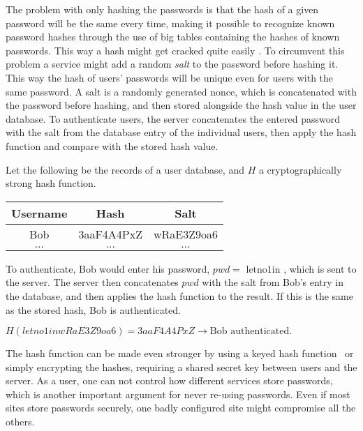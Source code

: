 \par The problem with only hashing the passwords is that the hash of a given password will be the same every time, making it possible to recognize known password hashes through the use of big tables containing the hashes of known passwords. This way a hash might get cracked quite easily . To circumvent this problem a service might add a random \emph{salt} to the password before hashing it. This way the hash of users' passwords will be unique even for users with the same password. A salt is a randomly generated nonce, which is concatenated with the password before hashing, and then stored alongside the hash value in the user database. To authenticate users, the server concatenates the entered password with the salt from the database entry of the individual users, then apply the hash function and compare with the stored hash value.

\begin{example}
Let the following be the records of a user database, and $H$ a cryptographically strong hash function.
    \begin{table}[ht!]
        \centering
    \begin{tabular}{|c|c|c|}
        \hline
        Username & Hash & Salt \\
        \hline
        Bob & 3aaF4A4PxZ & wRaE3Z9oa6 \\
        \hline
        $\dots$ & $\dots$ & $\dots$ \\
        \hline
    \end{tabular}
    \end{table}
\par To authenticate, Bob would enter his password, $pwd=\text{ letno1in }$, which is sent to the server. The server then concatenates $pwd$ with the salt from Bob's entry in the database, and then applies the hash function to the result. If this is the same as the stored hash, Bob is authenticated.\\
 \centerline{   $H(letno1inwRaE3Z9oa6) = 3aaF4A4PxZ \rightarrow \text{Bob authenticated}.$  }

\end{example}



The hash function can be made even stronger by using a keyed hash function~\cite{keyedhash} or simply encrypting the hashes, requiring a shared secret key between users and the server. As a user, one can not control how different services store passwords, which is another important argument for never re-using passwords. Even if most sites store passwords securely, one badly configured site might compromise all the others. 



